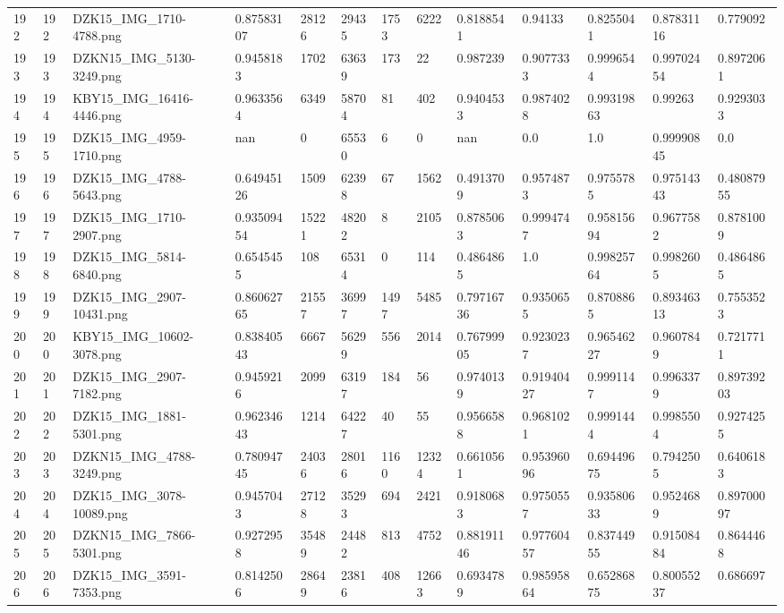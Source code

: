 \documentclass[11pt, a4paper, twoside]{report}
\begin{document}
\begin{longtable}[c]{@{}lllllllllllll@{}}
192 & 192 & DZK15\_IMG\_1710-4788.png & 0.87583107 & 28126 & 29435 & 1753 & 6222 & 0.8188541 & 0.94133 & 0.8255041 & 0.87831116 & 0.779092 \\
193 & 193 & DZKN15\_IMG\_5130-3249.png & 0.9458183 & 1702 & 63639 & 173 & 22 & 0.987239 & 0.9077333 & 0.9996544 & 0.99702454 & 0.8972061 \\
194 & 194 & KBY15\_IMG\_16416-4446.png & 0.9633564 & 6349 & 58704 & 81 & 402 & 0.9404533 & 0.9874028 & 0.99319863 & 0.99263 & 0.9293033 \\
195 & 195 & DZK15\_IMG\_4959-1710.png & nan & 0 & 65530 & 6 & 0 & nan & 0.0 & 1.0 & 0.99990845 & 0.0 \\
196 & 196 & DZK15\_IMG\_4788-5643.png & 0.64945126 & 1509 & 62398 & 67 & 1562 & 0.4913709 & 0.9574873 & 0.9755785 & 0.97514343 & 0.48087955 \\
197 & 197 & DZK15\_IMG\_1710-2907.png & 0.93509454 & 15221 & 48202 & 8 & 2105 & 0.8785063 & 0.9994747 & 0.95815694 & 0.9677582 & 0.8781009 \\
198 & 198 & DZK15\_IMG\_5814-6840.png & 0.6545455 & 108 & 65314 & 0 & 114 & 0.4864865 & 1.0 & 0.99825764 & 0.9982605 & 0.4864865 \\
199 & 199 & DZK15\_IMG\_2907-10431.png & 0.86062765 & 21557 & 36997 & 1497 & 5485 & 0.79716736 & 0.9350655 & 0.8708865 & 0.89346313 & 0.7553523 \\
200 & 200 & KBY15\_IMG\_10602-3078.png & 0.83840543 & 6667 & 56299 & 556 & 2014 & 0.76799905 & 0.9230237 & 0.96546227 & 0.9607849 & 0.7217711 \\
201 & 201 & DZK15\_IMG\_2907-7182.png & 0.9459216 & 2099 & 63197 & 184 & 56 & 0.9740139 & 0.91940427 & 0.9991147 & 0.9963379 & 0.89739203 \\
202 & 202 & DZK15\_IMG\_1881-5301.png & 0.96234643 & 1214 & 64227 & 40 & 55 & 0.9566588 & 0.9681021 & 0.9991444 & 0.9985504 & 0.9274255 \\
203 & 203 & DZKN15\_IMG\_4788-3249.png & 0.78094745 & 24036 & 28016 & 1160 & 12324 & 0.6610561 & 0.95396096 & 0.69449675 & 0.7942505 & 0.6406183 \\
204 & 204 & DZK15\_IMG\_3078-10089.png & 0.9457043 & 27128 & 35293 & 694 & 2421 & 0.9180683 & 0.9750557 & 0.93580633 & 0.9524689 & 0.89700097 \\
205 & 205 & DZKN15\_IMG\_7866-5301.png & 0.9272958 & 35489 & 24482 & 813 & 4752 & 0.88191146 & 0.97760457 & 0.83744955 & 0.91508484 & 0.8644468 \\
206 & 206 & DZK15\_IMG\_3591-7353.png & 0.8142506 & 28649 & 23816 & 408 & 12663 & 0.6934789 & 0.98595864 & 0.65286875 & 0.80055237 & 0.686697 \\

\end{longtable}
\end{document}
